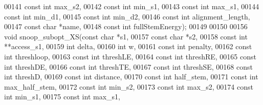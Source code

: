 \begin{DoxyCode}
00141                            \textcolor{keyword}{const} \textcolor{keywordtype}{int}  max\_s2,
00142                            \textcolor{keyword}{const} \textcolor{keywordtype}{int}  min\_s1,
00143                            \textcolor{keyword}{const} \textcolor{keywordtype}{int}  max\_s1,
00144                            \textcolor{keyword}{const} \textcolor{keywordtype}{int}  min\_d1,
00145                            \textcolor{keyword}{const} \textcolor{keywordtype}{int}  min\_d2,
00146                            \textcolor{keyword}{const} \textcolor{keywordtype}{int}  alignment\_length,
00147                            \textcolor{keyword}{const} \textcolor{keywordtype}{char} *name,
00148                            \textcolor{keyword}{const} \textcolor{keywordtype}{int}  fullStemEnergy);
00149 
00150 
00156 \textcolor{keywordtype}{void} snoop\_subopt\_XS(\textcolor{keyword}{const} \textcolor{keywordtype}{char} *s1,
00157                      \textcolor{keyword}{const} \textcolor{keywordtype}{char} *s2,
00158                      \textcolor{keyword}{const} \textcolor{keywordtype}{int}  **access\_s1,
00159                      \textcolor{keywordtype}{int}        delta,
00160                      \textcolor{keywordtype}{int}        w,
00161                      \textcolor{keyword}{const} \textcolor{keywordtype}{int}  penalty,
00162                      \textcolor{keyword}{const} \textcolor{keywordtype}{int}  threshloop,
00163                      \textcolor{keyword}{const} \textcolor{keywordtype}{int}  threshLE,
00164                      \textcolor{keyword}{const} \textcolor{keywordtype}{int}  threshRE,
00165                      \textcolor{keyword}{const} \textcolor{keywordtype}{int}  threshDE,
00166                      \textcolor{keyword}{const} \textcolor{keywordtype}{int}  threshTE,
00167                      \textcolor{keyword}{const} \textcolor{keywordtype}{int}  threshSE,
00168                      \textcolor{keyword}{const} \textcolor{keywordtype}{int}  threshD,
00169                      \textcolor{keyword}{const} \textcolor{keywordtype}{int}  distance,
00170                      \textcolor{keyword}{const} \textcolor{keywordtype}{int}  half\_stem,
00171                      \textcolor{keyword}{const} \textcolor{keywordtype}{int}  max\_half\_stem,
00172                      \textcolor{keyword}{const} \textcolor{keywordtype}{int}  min\_s2,
00173                      \textcolor{keyword}{const} \textcolor{keywordtype}{int}  max\_s2,
00174                      \textcolor{keyword}{const} \textcolor{keywordtype}{int}  min\_s1,
00175                      \textcolor{keyword}{const} \textcolor{keywordtype}{int}  max\_s1,

\end{DoxyCode}
